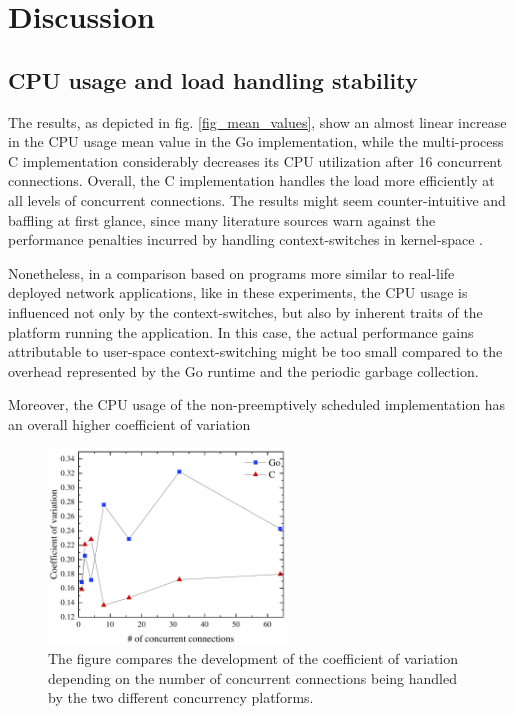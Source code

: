 \section{Discussion}
\subsection{CPU usage and load handling stability}
The results, as depicted in fig. \ref{fig_mean_values}, show an almost linear increase in the CPU usage mean value in the Go implementation, while the multi-process C implementation considerably decreases its CPU utilization after 16 concurrent connections. Overall, the C implementation handles the load more efficiently at all levels of concurrent connections. The results might seem counter-intuitive and baffling at first glance, since many literature sources warn against the performance penalties incurred by handling context-switches in kernel-space \cite{Cox-Buday2017}\cite{Kerrisk2010}. 

Nonetheless, in a comparison based on programs more similar to real-life deployed network applications, like in these experiments, the CPU usage is influenced not only by the context-switches, but also by inherent traits of the platform running the application. In this case, the actual performance gains attributable to user-space context-switching might be too small compared to the overhead represented by the Go runtime and the periodic garbage collection.

Moreover, the CPU usage of the non-preemptively scheduled implementation has an overall higher coefficient of variation 
\begin{figure}[h]
	\centering
	\includegraphics[width=2.5in]{img/cv_new.pdf}
	\caption{The figure compares the development of the coefficient of variation depending on the number of concurrent connections being handled by the two different concurrency platforms.}
	\label{fig_cv}
\end{figure}
